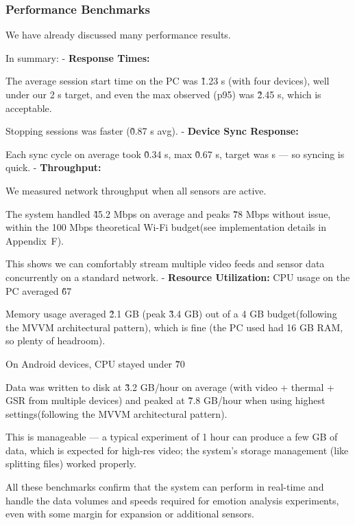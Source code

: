 {{{{{{{{{{{{{{{{\subsubsection{Performance Benchmarks}

We have already discussed many performance results.

In summary: - \textbf{Response Times:}

The average session start time on the PC was \~1.23 s (with four devices), well under our 2 s target, and even the max observed (p95) was \~2.45 s, which is acceptable.

Stopping sessions was faster (\~0.87 s avg). - \textbf{Device Sync Response:}

Each sync cycle on average took \~0.34 s, max \~0.67 s, target was  s --- so syncing is quick. - \textbf{Throughput:}

We measured network throughput when all sensors are active.

The system handled \~45.2 Mbps on average and peaks \~78 Mbps without issue, within the 100 Mbps theoretical Wi-Fi budget(see implementation details in Appendix~F).

This shows we can comfortably stream multiple video feeds and sensor data concurrently on a standard network. - \textbf{Resource Utilization:}
 CPU usage on the PC averaged \~67%

Memory usage averaged \~2.1 GB (peak \~3.4 GB) out of a 4 GB budget(following the MVVM architectural pattern), which is fine (the PC used had 16 GB RAM, so plenty of headroom).

On Android devices, CPU stayed under \~70%

Data was written to disk at \~3.2 GB/hour on average (with video + thermal + GSR from multiple devices) and peaked at \~7.8 GB/hour when using highest settings(following the MVVM architectural pattern).

This is manageable --- a typical experiment of 1 hour can produce a few GB of data, which is expected for high-res video; the system's storage management (like splitting files) worked properly.

All these benchmarks confirm that the system can perform in real-time and handle the data volumes and speeds required for emotion analysis experiments, even with some margin for expansion or additional sensors.

}}}}}}}}}}}}}}}}
